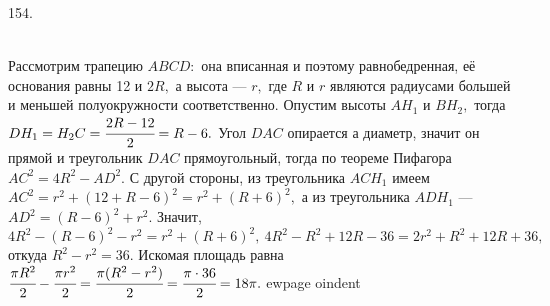 154. \begin{figure}[ht!]
\end{figure}\\
Рассмотрим трапецию $ABCD:$ она вписанная и поэтому равнобедренная, её основания равны 12 и $2R,$ а высота --- $r,$ где $R$ и $r$ являются радиусами большей и меньшей полуокружности соответственно. Опустим высоты $AH_1$ и $BH_2,$ тогда $DH_1=H_2C=\cfrac{2R-12}{2}=R-6.$ Угол $DAC$ опирается а диаметр, значит он прямой и треугольник $DAC$ прямоугольный, тогда по теореме Пифагора $AC^2=4R^2-AD^2.$ С другой стороны, из треугольника $ACH_1$ имеем $AC^2=r^2+(12+R-6)^2=r^2+(R+6)^2,$ а из треугольника $ADH_1$ --- $AD^2=(R-6)^2+r^2.$ Значит, $4R^2-(R-6)^2-r^2=r^2+(R+6)^2,\ 4R^2-R^2+12R-36=2r^2+R^2+12R+36,$ откуда $R^2-r^2=36.$ Искомая площадь равна $\cfrac{\pi R^2}{2}-\cfrac{\pi r^2}{2}=\cfrac{\pi(R^2-r^2)}{2}=\cfrac{\pi\cdot36}{2}=18\pi.$
ewpage
oindent
